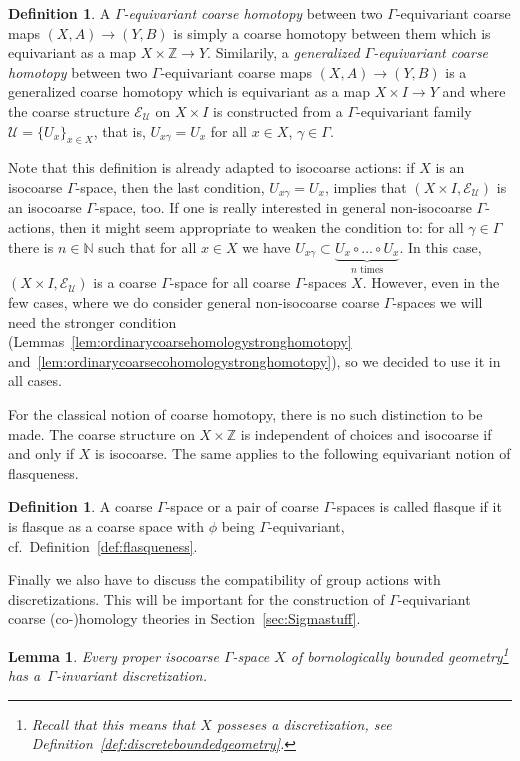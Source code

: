 \documentclass[pdftex]{sigma}
\numberwithin{equation}{section}
\newtheorem{lem}[thm]{Lemma}
\theoremstyle{definition}
\newtheorem{defn}[thm]{Definition}
\newcommand{\N}{\mathbb{N}}
\newcommand{\Z}{\mathbb{Z}}
\newcommand{\cU}{\mathcal{U}}
\newcommand{\coarseStr}{\mathcal{E}}
\begin{document}
\begin{defn}\label{def:equivcoarsehomotopy}
A \emph{$\Gamma$-equivariant coarse homotopy} between two $\Gamma$-equi\-variant coarse maps $(X,A)\to (Y,B)$ is simply a coarse homotopy between them which is equivariant as a map $X\times\Z\to Y$.
Similarily, a \emph{generalized $\Gamma$-equivariant coarse homotopy} between two $\Gamma$-equi\-variant coarse maps $(X,A)\to (Y,B)$ is a generalized coarse homotopy which is equivariant as a map $X\times I\to Y$ and where the coarse structure $\coarseStr_\cU$ on $X\times I$ is constructed from a $\Gamma$-equivariant family $\cU=\{U_x\}_{x\in X}$, that is, $U_{x\gamma}=U_x$ for all $x\in X$, $\gamma\in \Gamma$.
\end{defn}

Note that this definition is already adapted to isocoarse actions: if $X$ is an isocoarse $\Gamma$-space, then the last condition, $U_{x\gamma}=U_x$, implies that $(X\times I,\coarseStr_\cU)$ is an isocoarse $\Gamma$-space, too. If one is really interested in general non-isocoarse $\Gamma$-actions, then it might seem appropriate to weaken the condition to: for all $\gamma\in \Gamma$ there is $n\in\N$ such that for all $x\in X$ we have $U_{x\gamma}\subset\underbrace{U_x\circ\dots\circ U_x}_{n\text{ times}}$. In this case, $(X\times I,\coarseStr_\cU)$ is a coarse $\Gamma$-space for all coarse $\Gamma$-spaces $X$.
However, even in the few cases, where we do consider general non-isocoarse coarse $\Gamma$-spaces we will need the stronger condition (Lemmas~\ref{lem:ordinarycoarsehomologystronghomotopy} and~\ref{lem:ordinarycoarsecohomologystronghomotopy}), so we decided to use it in all cases.

For the classical notion of coarse homotopy, there is no such distinction to be made. The coarse structure on $X\times\Z$ is independent of choices and isocoarse if and only if $X$ is isocoarse.
The same applies to the following equivariant notion of flasqueness.
\begin{defn}\label{def:equiflasque}
A coarse $\Gamma$-space or a pair of coarse $\Gamma$-spaces is called flasque if it is flasque as a coarse space with $\phi$ being $\Gamma$-equivariant, cf.\ Definition~\ref{def:flasqueness}.
\end{defn}


Finally we also have to discuss the compatibility of group actions with discretizations. This will be important for the construction of $\Gamma$-equivariant coarse \mbox{(co-)}homology theories in Section~\ref{sec:Sigmastuff}.
\begin{lem}
Every proper isocoarse $\Gamma$-space $X$ of bornologically bounded geometry\footnote{Recall that this means that $X$ posseses a discretization, see Definition~\ref{def:discreteboundedgeometry}.} has a~$\Gamma$-invariant discretization.
\end{lem}
\end{document}
